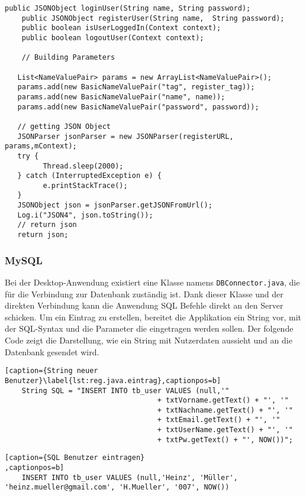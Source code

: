 \begin{lstlisting}[caption={User Functions},captionpos=b]
    public JSONObject loginUser(String name, String password);
    public JSONObject registerUser(String name,  String password);
    public boolean isUserLoggedIn(Context context);
    public boolean logoutUser(Context context);
    
    // Building Parameters

   List<NameValuePair> params = new ArrayList<NameValuePair>();
   params.add(new BasicNameValuePair("tag", register_tag));
   params.add(new BasicNameValuePair("name", name));
   params.add(new BasicNameValuePair("password", password));

   // getting JSON Object
   JSONParser jsonParser = new JSONParser(registerURL, params,mContext);
   try {
         Thread.sleep(2000);
   } catch (InterruptedException e) {
         e.printStackTrace();
   }
   JSONObject json = jsonParser.getJSONFromUrl();
   Log.i("JSON4", json.toString());
   // return json
   return json;
\end{lstlisting}


\subsubsection{MySQL}
Bei der Desktop-Anwendung existiert eine Klasse namens \texttt{DBConnector.java}, die für die Verbindung zur Datenbank zuständig ist. Dank dieser Klasse und der direkten Verbindung kann die Anwendung SQL Befehle direkt an den Server schicken. Um ein Eintrag zu erstellen, bereitet die Applikation ein String vor, mit der SQL-Syntax und die Parameter die eingetragen werden sollen. Der folgende Code zeigt die Darstellung, wie ein String mit Nutzerdaten aussieht und an die Datenbank gesendet wird.


\begin{lstlisting}[caption={String neuer Benutzer}\label{lst:reg.java.eintrag},captionpos=b]
	String SQL = "INSERT INTO tb_user VALUES (null,'"
									+ txtVorname.getText() + "', '"
									+ txtNachname.getText() + "', '"
									+ txtEmail.getText() + "', '"
									+ txtUserName.getText() + "', '"
									+ txtPw.getText() + "', NOW())";
\end{lstlisting}

\begin{lstlisting}[caption={SQL Benutzer eintragen}
,captionpos=b]
	INSERT INTO tb_user VALUES (null,'Heinz', 'Müller', 'heinz.mueller@gmail.com', 'H.Mueller', '007', NOW())
\end{lstlisting}

